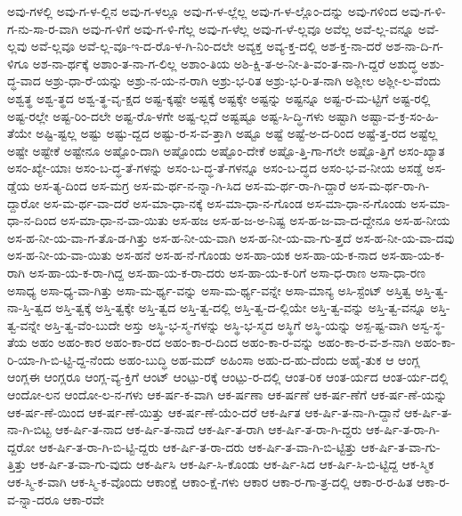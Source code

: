 {ಅವು-ಗಳಲ್ಲಿ
ಅವು-ಗ-ಳ-ಲ್ಲಿನ
ಅವು-ಗ-ಳಲ್ಲೂ
ಅವು-ಗ-ಳ-ಲ್ಲೆಲ್ಲ
ಅವು-ಗ-ಳ-ಲ್ಲೊಂ-ದನ್ನು
ಅವು-ಗಳಿಂದ
ಅವು-ಗ-ಳಿ-ಗ-ನು-ಸಾ-ರ-ವಾಗಿ
ಅವು-ಗ-ಳಿಗೆ
ಅವು-ಗ-ಳಿ-ಗೆಲ್ಲ
ಅವು-ಗ-ಳೆಲ್ಲ
ಅವು-ಗ-ಳೆ-ಲ್ಲವೂ
ಅವೆಲ್ಲ
ಅವೆ-ಲ್ಲ-ವನ್ನೂ
ಅವೆ-ಲ್ಲವು
ಅವೆ-ಲ್ಲವೂ
ಅವೆ-ಲ್ಲ-ವೂ-ಇ-ದ-ರೊ-ಳ-ಗಿ-ನಿಂ-ದಲೇ
ಅವ್ಯಕ್ತ
ಅವ್ಯ-ಕ್ತ-ದಲ್ಲಿ
ಅಶ-ಕ್ತ-ನಾ-ದರೆ
ಅಶ-ನಾ-ದಿ-ಗ-ಳಿಗೂ
ಅಶ-ನಾ-ರ್ಥಕ್ಕೆ
ಅಶಾಂ-ತ-ನಾ-ಗ-ಲಿಲ್ಲ
ಅಶಾಂ-ತಿಯ
ಅಶಿ-ಕ್ಷಿ-ತ-ಅ-ನೀ-ತಿ-ವಂ-ತ-ನಾ-ಗಿ-ದ್ದರೆ
ಅಶುದ್ಧ
ಅಶು-ದ್ಧ-ವಾದ
ಅಶ್ರು-ಧಾ-ರೆ-ಯನ್ನು
ಅಶ್ರು-ನ-ಯ-ನ-ರಾಗಿ
ಅಶ್ರು-ಭ-ರಿತ
ಅಶ್ರು-ಭ-ರಿ-ತ-ನಾಗಿ
ಅಶ್ಲೀಲ
ಅಶ್ಲೀ-ಲ-ವೆಂದು
ಅಶ್ವತ್ಥ
ಅಶ್ವ-ತ್ಥದ
ಅಶ್ವ-ತ್ಥ-ವೃ-ಕ್ಷದ
ಅಷ್ಟ-ಕ್ಕಷ್ಟೇ
ಅಷ್ಟಕ್ಕೆ
ಅಷ್ಟಕ್ಕೇ
ಅಷ್ಟನ್ನು
ಅಷ್ಟನ್ನೂ
ಅಷ್ಟ-ರ-ಮ-ಟ್ಟಿಗೆ
ಅಷ್ಟ-ರಲ್ಲಿ
ಅಷ್ಟ-ರಲ್ಲೇ
ಅಷ್ಟ-ರಿಂ-ದಲೇ
ಅಷ್ಟ-ರೊ-ಳಗೇ
ಅಷ್ಟ-ಲ್ಲದೆ
ಅಷ್ಟಷ್ಟೂ
ಅಷ್ಟ-ಸಿ-ದ್ಧಿ-ಗಳು
ಅಷ್ಟಾಗಿ
ಅಷ್ಟಾ-ವ-ಕ್ರ-ಸಂ-ಹಿ-ತೆಯೇ
ಅಷ್ಟಿ-ಷ್ಟಲ್ಲ
ಅಷ್ಟು
ಅಷ್ಟು-ದ್ದದ
ಅಷ್ಟು-ರ-ಸ-ವ-ತ್ತಾಗಿ
ಅಷ್ಟೂ
ಅಷ್ಟೆ
ಅಷ್ಟೆ-ಅ-ದ-ರಿಂದ
ಅಷ್ಟೆ-ತ್ತ-ರದ
ಅಷ್ಟೆಲ್ಲ
ಅಷ್ಟೇ
ಅಷ್ಟೇಕೆ
ಅಷ್ಟೇನೂ
ಅಷ್ಟೊಂ-ದಾಗಿ
ಅಷ್ಟೊಂದು
ಅಷ್ಟೊಂ-ದೇಕೆ
ಅಷ್ಟೊ-ತ್ತಿ-ಗಾ-ಗಲೇ
ಅಷ್ಟೊ-ತ್ತಿಗೆ
ಅಸಂ-ಖ್ಯಾತ
ಅಸಂ-ಖ್ಯೇ-ಯಾಃ
ಅಸಂ-ಬ-ದ್ಧ-ತೆ-ಗಳನ್ನು
ಅಸಂ-ಬ-ದ್ಧ-ತೆ-ಗಳನ್ನೂ
ಅಸಂ-ಬ-ದ್ಧದ
ಅಸಂ-ಭ-ವ-ನೀಯ
ಅಸಡ್ಡೆ
ಅಸ-ಡ್ಡೆಯ
ಅಸ-ತ್ಯ-ದಿಂದ
ಅಸ-ಮಗ್ರ
ಅಸ-ಮ-ರ್ಥ-ನ-ನ್ನಾ-ಗಿ-ಸಿದ
ಅಸ-ಮ-ರ್ಥ-ರಾ-ಗಿ-ದ್ದಾರೆ
ಅಸ-ಮ-ರ್ಥ-ರಾ-ಗಿ-ದ್ದಾರೋ
ಅಸ-ಮ-ರ್ಥ-ವಾ-ದರೆ
ಅಸ-ಮಾ-ಧಾ-ನಕ್ಕೆ
ಅಸ-ಮಾ-ಧಾ-ನ-ಗೊಂಡ
ಅಸ-ಮಾ-ಧಾ-ನ-ಗೊಂಡು
ಅಸ-ಮಾ-ಧಾ-ನ-ದಿಂದ
ಅಸ-ಮಾ-ಧಾ-ನ-ವಾ-ಯಿತು
ಅಸ-ಹಜ
ಅಸ-ಹ-ಜ-ಅ-ನಿಷ್ಟ
ಅಸ-ಹ-ಜ-ವಾ-ದ-ದ್ದೇನೂ
ಅಸ-ಹ-ನೀಯ
ಅಸ-ಹ-ನೀ-ಯ-ವಾ-ಗ-ತೊ-ಡ-ಗಿತ್ತು
ಅಸ-ಹ-ನೀ-ಯ-ವಾಗಿ
ಅಸ-ಹ-ನೀ-ಯ-ವಾ-ಗು-ತ್ತದೆ
ಅಸ-ಹ-ನೀ-ಯ-ವಾ-ದವು
ಅಸ-ಹ-ನೀ-ಯ-ವಾ-ಯಿತು
ಅಸ-ಹನೆ
ಅಸ-ಹ-ನೆ-ಗೊಂಡು
ಅಸ-ಹಾ-ಯಕ
ಅಸ-ಹಾ-ಯ-ಕ-ನಾದ
ಅಸ-ಹಾ-ಯ-ಕ-ರಾಗಿ
ಅಸ-ಹಾ-ಯ-ಕ-ರಾ-ಗಿದ್ದ
ಅಸ-ಹಾ-ಯ-ಕ-ರಾ-ದರು
ಅಸ-ಹಾ-ಯ-ಕ-ರಿಗೆ
ಅಸಾ-ಧ-ರಾಣ
ಅಸಾ-ಧಾ-ರಣ
ಅಸಾಧ್ಯ
ಅಸಾ-ಧ್ಯ-ವಾ-ಗಿತ್ತು
ಅಸಾ-ಮ-ರ್ಥ್ಯ-ವನ್ನು
ಅಸಾ-ಮ-ರ್ಥ್ಯ-ವನ್ನೇ
ಅಸಾ-ಮಾನ್ಯ
ಅಸಿ-ಸ್ಟೆಂಟ್
ಅಸ್ತಿತ್ವ
ಅಸ್ತಿ-ತ್ವ-ನಾ-ಸ್ತಿ-ತ್ವದ
ಅಸ್ತಿ-ತ್ವಕ್ಕೆ
ಅಸ್ತಿ-ತ್ವಕ್ಕೇ
ಅಸ್ತಿ-ತ್ವದ
ಅಸ್ತಿ-ತ್ವ-ದಲ್ಲಿ
ಅಸ್ತಿ-ತ್ವ-ದ-ಲ್ಲಿಯೇ
ಅಸ್ತಿ-ತ್ವ-ವನ್ನು
ಅಸ್ತಿ-ತ್ವ-ವನ್ನೂ
ಅಸ್ತಿ-ತ್ವ-ವನ್ನೇ
ಅಸ್ತಿ-ತ್ವ-ವೆಂ-ಬುದೇ
ಅಸ್ತು
ಅಸ್ಥಿ-ಭ-ಸ್ಮ-ಗಳನ್ನು
ಅಸ್ಥಿ-ಭ-ಸ್ಮದ
ಅಸ್ಥಿಗೆ
ಅಸ್ಥಿ-ಯನ್ನು
ಅಸ್ಪ-ಷ್ಟ-ವಾಗಿ
ಅಸ್ವ-ಸ್ಥ-ತೆಯ
ಅಹಂ
ಅಹಂ-ಕಾರ
ಅಹಂ-ಕಾ-ರದ
ಅಹಂ-ಕಾ-ರ-ದಿಂದ
ಅಹಂ-ಕಾ-ರ-ವನ್ನು
ಅಹಂ-ಕಾ-ರ-ವ-ಶ-ನಾಗಿ
ಅಹಂ-ಕಾ-ರಿ-ಯಾ-ಗಿ-ಬಿ-ಟ್ಟಿ-ದ್ದ-ನೆಂದು
ಅಹಂ-ಬುದ್ಧಿ
ಅಹ-ಮದ್
ಅಹಿಂಸಾ
ಅಹು-ದ-ಹು-ದೆಂದು
ಅಹೈ-ತುಕ
ಆ
ಆಂಗ್ಲ
ಆಂಗ್ಲಈ
ಆಂಗ್ಲರೂ
ಆಂಗ್ಲ-ವ್ಯ-ಕ್ತಿಗೆ
ಆಂಟ್
ಆಂಟ್ಪು-ರಕ್ಕೆ
ಆಂಟ್ಪು-ರ-ದಲ್ಲಿ
ಆಂತ-ರಿಕ
ಆಂತ-ರ್ಯದ
ಆಂತ-ರ್ಯ-ದಲ್ಲಿ
ಆಂದೋ-ಲನ
ಆಂದೋ-ಲ-ನ-ಗಳು
ಆಕ-ರ್ಷ-ಕ-ವಾಗಿ
ಆಕ-ರ್ಷಣಾ
ಆಕ-ರ್ಷಣೆ
ಆಕ-ರ್ಷ-ಣೆಗೆ
ಆಕ-ರ್ಷ-ಣೆ-ಯನ್ನು
ಆಕ-ರ್ಷ-ಣೆ-ಯಿಂದ
ಆಕ-ರ್ಷ-ಣೆ-ಯಿತ್ತು
ಆಕ-ರ್ಷ-ಣೆ-ಯೆಂ-ದರೆ
ಆಕ-ರ್ಷಿತ
ಆಕ-ರ್ಷಿ-ತ-ನಾ-ಗಿ-ದ್ದಾನೆ
ಆಕ-ರ್ಷಿ-ತ-ನಾ-ಗಿ-ಬಿಟ್ಟ
ಆಕ-ರ್ಷಿ-ತ-ನಾದ
ಆಕ-ರ್ಷಿ-ತ-ನಾದೆ
ಆಕ-ರ್ಷಿ-ತ-ರಾಗಿ
ಆಕ-ರ್ಷಿ-ತ-ರಾ-ಗಿ-ದ್ದರು
ಆಕ-ರ್ಷಿ-ತ-ರಾ-ಗಿ-ದ್ದರೋ
ಆಕ-ರ್ಷಿ-ತ-ರಾ-ಗಿ-ಬಿ-ಟ್ಟಿ-ದ್ದರು
ಆಕ-ರ್ಷಿ-ತ-ರಾ-ದರು
ಆಕ-ರ್ಷಿ-ತ-ವಾ-ಗಿ-ಬಿ-ಟ್ಟಿತ್ತು
ಆಕ-ರ್ಷಿ-ತ-ವಾ-ಗು-ತ್ತಿತ್ತು
ಆಕ-ರ್ಷಿ-ತ-ವಾ-ಗು-ವುದು
ಆಕ-ರ್ಷಿಸಿ
ಆಕ-ರ್ಷಿ-ಸಿ-ಕೊಂಡು
ಆಕ-ರ್ಷಿ-ಸಿದ
ಆಕ-ರ್ಷಿ-ಸಿ-ಬಿ-ಟ್ಟಿದ್ದ
ಆಕ-ಸ್ಮಿಕ
ಆಕ-ಸ್ಮಿ-ಕ-ವಾಗಿ
ಆಕ-ಸ್ಮಿ-ಕ-ವೊಂದು
ಆಕಾಂಕ್ಷೆ
ಆಕಾಂ-ಕ್ಷೆ-ಗಳು
ಆಕಾರ
ಆಕಾ-ರ-ಗಾ-ತ್ರ-ದಲ್ಲಿ
ಆಕಾ-ರ-ರ-ಹಿತ
ಆಕಾ-ರ-ವ-ನ್ನಾ-ದರೂ
ಆಕಾ-ರವೇ
}
